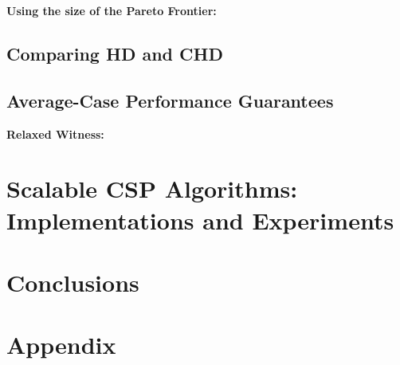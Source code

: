 \documentclass[a4paper,UKenglish]{lipics-v2016}
\renewcommand{\paragraph}[1]{\smallskip\noindent\textbf{#1}}
\theoremstyle{plain}
\begin{document}
\paragraph{Using the size of the Pareto Frontier:}
\label{sec:frontier}


\subsection{Comparing HD and CHD}
\label{ssec:hdvschd}


\subsection{Average-Case Performance Guarantees}
\label{sec:avg_hd}


\paragraph{Relaxed Witness:}
\label{sec:relaxed_witness}


\section{Scalable CSP Algorithms:\texorpdfstring{}{ } Implementations and Experiments}
\label{sec:numeric}


\section{Conclusions}
\label{sec:conclu}


\clearpage

\appendix
\section{Appendix}
\end{document}
